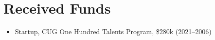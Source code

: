 \section*{Received Funds}

\begin{itemize}
\item Startup, CUG One Hundred Talents Program, \$280k (2021--2006)
\end{itemize}
